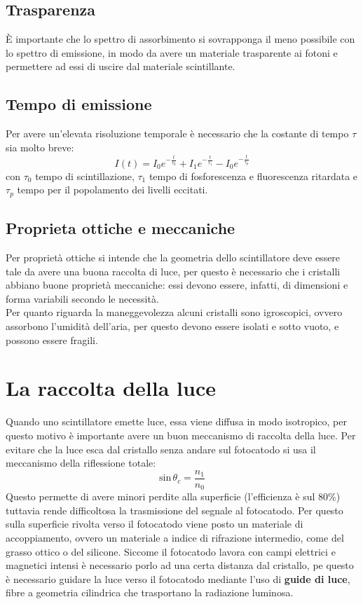 \subsection{Trasparenza}
\`E importante che lo spettro di assorbimento si sovrapponga il meno possibile con lo spettro di emissione, in modo da avere un materiale trasparente ai fotoni e
permettere ad essi di uscire dal materiale scintillante.
\subsection{Tempo di emissione}
Per avere un'elevata risoluzione temporale \`e necessario che la costante di tempo $\tau$ sia molto breve:
\begin{equation*}
I(t) = I_0 e^{-\frac{t}{\tau_0}} + I_1 e^{-\frac{t}{\tau_1}} - I_0 e^{-\frac{t}{\tau_p}}
\end{equation*}
con $\tau_0$ tempo di scintillazione, $\tau_1$ tempo di fosforescenza e fluorescenza ritardata e $\tau_p$ tempo per il popolamento dei livelli eccitati.
\subsection{Proprieta ottiche e meccaniche}
Per propriet\`a ottiche si intende che la geometria dello scintillatore deve essere tale da avere una buona raccolta di luce, per questo \`e necessario
che i cristalli abbiano buone propriet\`a meccaniche: essi devono essere, infatti, di dimensioni e forma variabili secondo le necessit\`a.\\
Per quanto riguarda la maneggevolezza alcuni cristalli sono igroscopici, ovvero assorbono l'umidit\`a dell'aria, per questo devono essere isolati e sotto vuoto, e possono
essere fragili.
\section{La raccolta della luce}
Quando uno scintillatore emette luce, essa viene diffusa in modo isotropico, per questo motivo \`e importante avere un buon meccanismo di raccolta della luce.
Per evitare che la luce esca dal cristallo senza andare sul fotocatodo si usa il meccanismo della riflessione totale:
\begin{equation*}
\text{sin} \, \theta_c = \frac{n_1}{n_0}
\end{equation*}
Questo permette di avere minori perdite alla superficie (l'efficienza \`e sul 80\%) tuttavia rende difficoltosa la trasmissione del segnale al fotocatodo.
Per questo sulla superficie rivolta verso il fotocatodo viene posto un materiale di accoppiamento, ovvero un materiale a indice di rifrazione intermedio, come
del grasso ottico o del silicone.
Siccome il fotocatodo lavora con campi elettrici e magnetici intensi \`e necessario porlo ad una certa distanza dal cristallo, pe questo
\`e necessario guidare la luce verso il fotocatodo mediante l'uso di \textbf{guide di luce}, fibre a geometria cilindrica che trasportano la radiazione luminosa.
